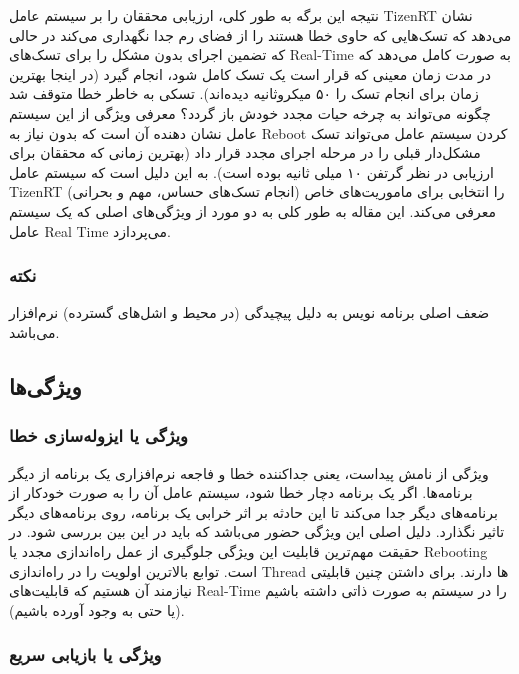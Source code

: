 \documentclass[10pt, a4paper]{article}
\begin{document}
نتیجه این برگه به طور کلی، ارزیابی محققان را بر سیستم عامل TizenRT نشان می‌دهد
که تسک‌هایی که حاوی خطا هستند را از فضای رم جدا نگهداری می‌کند در حالی که تضمین
اجرای بدون مشکل را برای تسک‌های Real-Time به صورت کامل می‌دهد که در مدت زمان
معینی که قرار است یک تسک کامل شود، انجام گیرد (در اینجا بهترین زمان برای انجام
تسک را ۵۰ میکروثانیه دیده‌اند). تسکی به خاطر خطا متوقف شد چگونه می‌تواند به چرخه
حیات مجدد خودش باز گردد؟ معرفی ویژگی  از این سیستم عامل نشان
دهنده آن است که بدون نیاز به Reboot کردن سیستم عامل می‌تواند تسک مشکل‌دار قبلی
را در مرحله اجرای مجدد قرار داد (بهترین زمانی که محققان برای ارزیابی در نظر
گرتفن ۱۰ میلی ثانیه بوده است). به این دلیل است که سیستم عامل TizenRT را انتخابی
برای ماموریت‌های خاص (انجام تسک‌های حساس، مهم و بحرانی) معرفی می‌کند. این مقاله
به طور کلی به دو مورد از ویژگی‌های اصلی که یک سیستم عامل Real Time می‌پردازد.

\subsubsection*{نکته}

ضعف اصلی برنامه نویس به دلیل پیچیدگی (در محیط و اشل‌های گسترده) نرم‌افزار
می‌باشد.

\subsection{ویژگی‌ها}

\subsubsection{ویژگی  یا ایزوله‌سازی خطا}

ویژگی  از نامش پیداست، یعنی جداکننده خطا و فاجعه نرم‌افزاری
یک برنامه از دیگر برنامه‌ها. اگر یک برنامه دچار خطا شود، سیستم‌ عامل آن را به
صورت خودکار از برنامه‌های دیگر جدا می‌کند تا این حادثه بر اثر خرابی یک برنامه،
روی برنامه‌های دیگر تاثیر نگذارد. دلیل اصلی این ویژگی حضور  می‌باشد که باید در این بین بررسی شود. در حقیقت مهم‌ترین قابلیت این
ویژگی جلوگیری از عمل راه‌اندازی مجدد یا Rebooting است. توابع 
بالاترین اولویت را  در راه‌اندازی Thread ها دارند. برای داشتن چنین قابلیتی
نیازمند آن هستیم که قابلیت‌های Real-Time را در سیستم به صورت ذاتی داشته باشیم
(یا حتی به وجود آورده باشیم).

\subsubsection{ویژگی  یا بازیابی سریع}
\end{document}
